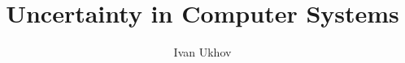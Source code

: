 \documentclass{thesis}
\title{Uncertainty in Computer Systems}
\author{Ivan Ukhov}
\begin{document}
\nocite{ukhov2012, ukhov2014a, ukhov2014b, ukhov2015, ukhov2017}







\printbibliography
\end{document}
